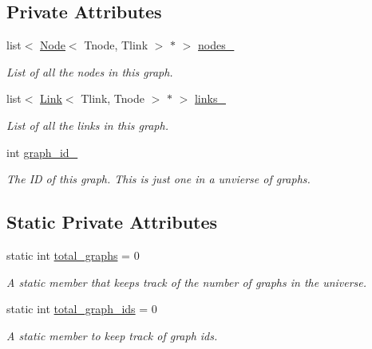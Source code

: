 \subsection*{Private Attributes}
\begin{DoxyCompactItemize}
\item 
\hypertarget{classGraph_ace44e35900691f95e5a5682e4e2327ab}{list$<$ \hyperlink{classNode}{Node}$<$ Tnode, Tlink $>$ $\ast$ $>$ \hyperlink{classGraph_ace44e35900691f95e5a5682e4e2327ab}{nodes\-\_\-}}\label{classGraph_ace44e35900691f95e5a5682e4e2327ab}

\begin{DoxyCompactList}\small\item\em List of all the nodes in this graph. \end{DoxyCompactList}\item 
\hypertarget{classGraph_a29805ae6b277e123503893d1b76fe22e}{list$<$ \hyperlink{classLink}{Link}$<$ Tlink, Tnode $>$ $\ast$ $>$ \hyperlink{classGraph_a29805ae6b277e123503893d1b76fe22e}{links\-\_\-}}\label{classGraph_a29805ae6b277e123503893d1b76fe22e}

\begin{DoxyCompactList}\small\item\em List of all the links in this graph. \end{DoxyCompactList}\item 
\hypertarget{classGraph_a6146b243a8de0cfe58d2855fbf61dd63}{int \hyperlink{classGraph_a6146b243a8de0cfe58d2855fbf61dd63}{graph\-\_\-id\-\_\-}}\label{classGraph_a6146b243a8de0cfe58d2855fbf61dd63}

\begin{DoxyCompactList}\small\item\em The I\-D of this graph. This is just one in a unvierse of graphs. \end{DoxyCompactList}\end{DoxyCompactItemize}
\subsection*{Static Private Attributes}
\begin{DoxyCompactItemize}
\item 
static int \hyperlink{classGraph_a2222ebedfb7b3cd4f1bd6717a2c1b881}{total\-\_\-graphs} = 0
\begin{DoxyCompactList}\small\item\em A static member that keeps track of the number of graphs in the universe. \end{DoxyCompactList}\item 
\hypertarget{classGraph_a055d56d93fbc031ff821c715b408d434}{static int \hyperlink{classGraph_a055d56d93fbc031ff821c715b408d434}{total\-\_\-graph\-\_\-ids} = 0}\label{classGraph_a055d56d93fbc031ff821c715b408d434}

\begin{DoxyCompactList}\small\item\em A static member to keep track of graph ids. \end{DoxyCompactList}\end{DoxyCompactItemize}



